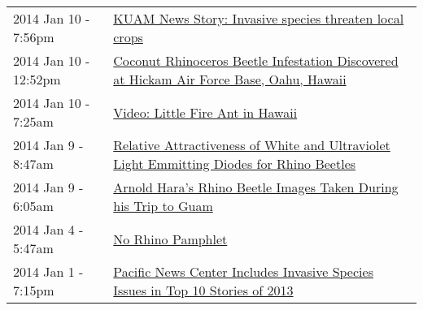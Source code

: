 \begin{longtable}{p{} p{}}
2014 Jan 10 - 7:56pm & \href{http://guaminsects.net/anr/content/kuam-news-story-invasive-species-threaten-local-crops}{KUAM News Story: Invasive species threaten local crops} \\
2014 Jan 10 - 12:52pm & \href{http://guaminsects.net/anr/content/coconut-rhinoceros-beetle-infestation-discovered-hickam-air-force-base-oahu-hawaii}{Coconut Rhinoceros Beetle Infestation Discovered at Hickam Air Force Base, Oahu, Hawaii} \\
2014 Jan 10 - 7:25am & \href{http://guaminsects.net/anr/content/video-little-fire-ant-hawaii}{Video: Little Fire Ant in Hawaii} \\
2014 Jan 9 - 8:47am & \href{http://guaminsects.net/anr/content/relative-attractiveness-white-and-ultraviolet-light-emmitting-diodes-rhino-beetles}{Relative Attractiveness of White and Ultraviolet Light Emmitting Diodes for Rhino Beetles} \\
2014 Jan 9 - 6:05am & \href{http://guaminsects.net/anr/content/arnold-haras-rhino-beetle-images-taken-during-his-trip-guam}{Arnold Hara's Rhino Beetle Images Taken During his Trip to Guam} \\
2014 Jan 4 - 5:47am & \href{http://guaminsects.net/anr/content/no-rhino-pamphlet}{No Rhino Pamphlet} \\
2014 Jan 1 - 7:15pm & \href{http://guaminsects.net/anr/content/pacific-news-center-includes-invasive-species-issues-top-10-stories-2013}{Pacific News Center Includes Invasive Species Issues in Top 10 Stories of 2013} \\
\end{longtable}